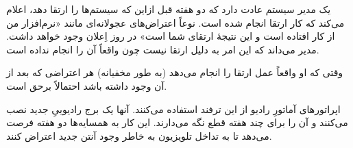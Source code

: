 \begin{tcolorbox}
    یک مدیر سیستم عادت دارد که دو هفته قبل ازاین که سیستم‌ها را ارتقا دهد، اعلام می‌کند که کار ارتقا انجام شده است. نوعاً اعتراض‌های عجولانه‌ای مانند «نرم‌افزار من از کار افتاده است و این نتیجهٔ ارتقای شما است» در روز اِعلان وجود خواهد داشت. مدیر می‌داند که این امر به دلیل ارتقا نیست چون واقعاً آن را انجام نداده است.

    وقتی که او واقعاً عمل ارتقا را انجام می‌دهد (به طور مخفیانه) هر اعتراضی که بعد از آن وجود داشته باشد احتمالاً برحق است.

    اپراتورهای آماتورِ رادیو از این ترفند استفاده می‌کنند. آنها یک برج رادیوییِ جدید نصب می‌کنند و آن را برای چند هفته قطع نگه می‌دارند. این کار به همسایه‌ها دو هفته فرصت می‌دهد تا به تداخل تلویزیون به خاطر وجود آنتن جدید اعتراض کنند.
\end{tcolorbox}